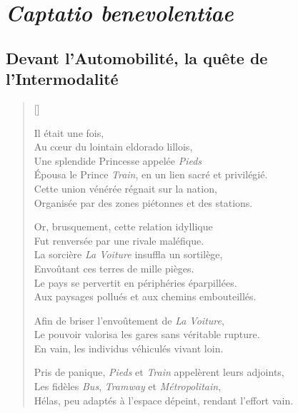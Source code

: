     \cleardoublepage
\section*{\textsl{Captatio benevolentiae}
    \label{body:mt180}
    }

\subsection*{Devant l'Automobilité, la quête de l'Intermodalité}
    
\settowidth{\versewidth}{And objects at rest tended to remain at rest}
\begin{verse}[\versewidth]

Il était une fois,\\
Au cœur du lointain eldorado lillois,\\
Une splendide Princesse appelée \textsl{Pieds}\\
Épousa le Prince \textsl{Train}, en un lien sacré et privilégié.\\
Cette union vénérée régnait sur la nation,\\
Organisée par des zones piétonnes et des stations.

Or, brusquement, cette relation idyllique\\
Fut renversée par une rivale maléfique.\\
La sorcière \textsl{La Voiture} insuffla un sortilège,\\
Envoûtant ces terres de mille pièges.\\
Le pays se pervertit en périphéries éparpillées.\\
Aux paysages pollués et aux chemins embouteillés.

Afin de briser l’envoûtement de \textsl{La Voiture},\\
Le pouvoir valorisa les gares sans véritable rupture.\\
En vain, les individus véhiculés vivant loin.

Pris de panique, \textsl{Pieds} et \textsl{Train} appelèrent leurs adjoints,\\
Les fidèles \textsl{Bus}, \textsl{Tramway} et \textsl{Métropolitain},\\
Hélas, peu adaptés à l’espace dépeint, rendant l'effort vain.


\end{verse}
